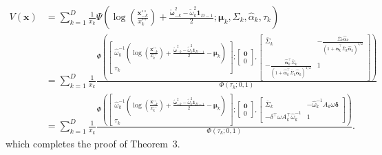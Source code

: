 \documentclass[lineno]{biometrika}
\begin{document}
\begin{align*}
V(\bm x) &= \sum_{k=1}^D \frac{1}{x_k}
\Psi \left( \log \left( \frac{\bm x^{\circ\circ}_{-k}}{x^{\circ\circ}_k} \right) + \frac{\tilde{\bm \omega}_{-k}^2 - \tilde{\omega}_k^2\bm 1_{D-1}}{2} ; \bm \mu_k, \Sigma_k, \hat{\alpha}_k, \tau_k \right) \\
%
&= \sum_{k=1}^D \frac{1}{x_k} 
\frac{\Phi \left(
    \begin{bmatrix} 
        \hat{\omega}_k^{-1}\left( \log \left( \frac{\bm x^{\circ\circ}_{-k}}{x^{\circ\circ}_k} \right) + \frac{\tilde{\bm \omega}_{-k}^2 - \tilde{\omega}_k^2\bm 1_{D-1}}{2} - \bm \mu_k\right)  \\
        \tau_k
    \end{bmatrix};
    \begin{bmatrix} 
    \bm 0 \\ 0
    \end{bmatrix},
    \begin{bmatrix}
        \bar\Sigma_k & -\frac{\bar{\Sigma}_k \hat{\bm\alpha}_k}{(1+\hat{\bm\alpha}_k^\top\bar{\Sigma}_k \hat{\bm\alpha}_k)^{1/2}} \\
       -\frac{\hat{\bm\alpha}_k^\top\bar{\Sigma}_k}{\left(1+\hat{\bm\alpha}_k^\top\bar{\Sigma}_k \hat{\bm\alpha}_k\right)^{1/2}} &	1
    \end{bmatrix} \right)
    }
    {\Phi\left(\tau_k; 0, 1\right)} \\
&= \sum_{k=1}^D \frac{1}{x_k} 
\frac{\Phi \left(
    \begin{bmatrix} 
        \hat{\omega}_k^{-1}\left( \log \left( \frac{\bm x^{\circ\circ}_{-k}}{x^{\circ\circ}_k} \right) + \frac{\tilde{\bm \omega}_{-k}^2 - \tilde{\omega}_k^2\bm 1_{D-1}}{2} - \bm \mu_k\right)  \\
        \tau_k
    \end{bmatrix};
    \begin{bmatrix} 
    \bm 0 \\ 0
    \end{bmatrix},
    \begin{bmatrix}
        \bar\Sigma_k & - \hat{\omega}_k^{-1} A_k \omega \bm \delta \\
       - \delta^\top \omega A_k^\top \hat{\omega}_k^{-1} &	1
    \end{bmatrix} \right)
    }
    {\Phi\left(\tau_k; 0, 1\right)}.
\end{align*}
%
which completes the proof of Theorem~3.
\end{document}
